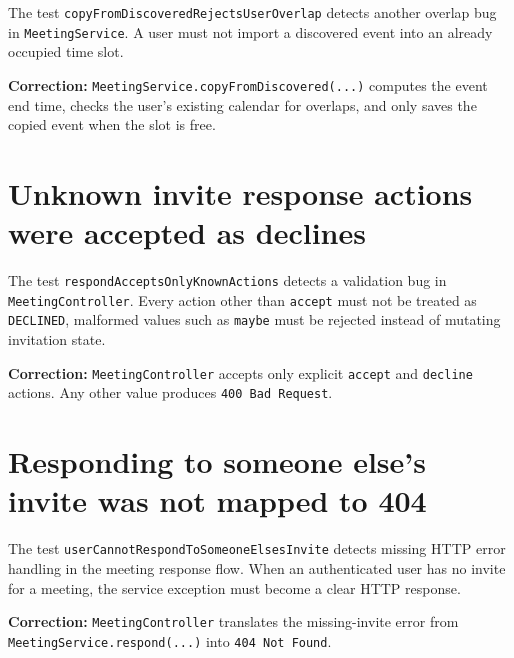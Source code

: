 The test \texttt{copyFromDiscoveredRejectsUserOverlap} detects another overlap bug in \texttt{MeetingService}. A user must not import a discovered event into an already occupied time slot.

\textbf{Correction:} \texttt{MeetingService.copyFromDiscovered(...)} computes the event end time, checks the user's existing calendar for overlaps, and only saves the copied event when the slot is free.

\section{Unknown invite response actions were accepted as declines}

The test \texttt{respondAcceptsOnlyKnownActions} detects a validation bug in \texttt{MeetingController}. Every action other than \texttt{accept} must not be treated as \texttt{DECLINED}, malformed values such as \texttt{maybe} must be rejected instead of mutating invitation state.

\textbf{Correction:} \texttt{MeetingController} accepts only explicit \texttt{accept} and \texttt{decline} actions. Any other value produces \texttt{400 Bad Request}.

\section{Responding to someone else's invite was not mapped to 404}

The test \texttt{userCannotRespondToSomeoneElsesInvite} detects missing HTTP error handling in the meeting response flow. When an authenticated user has no invite for a meeting, the service exception must become a clear HTTP response.

\textbf{Correction:} \texttt{MeetingController} translates the missing-invite error from \texttt{MeetingService.respond(...)} into \texttt{404 Not Found}.
